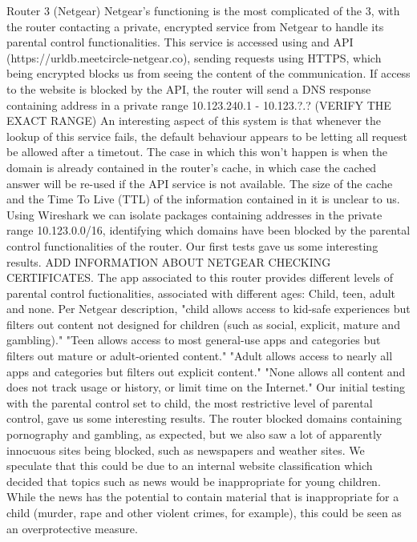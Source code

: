 Router 3 (Netgear)
Netgear's functioning is the most complicated of the 3, with the router contacting a private, encrypted service from Netgear to handle its parental control functionalities.
This service is accessed using and API (https://urldb.meetcircle-netgear.co), sending requests using HTTPS, which being encrypted blocks us from seeing the content of the communication.
If access to the website is blocked by the API, the router will send a DNS response containing address in a private range 10.123.240.1 - 10.123.?.? (VERIFY THE EXACT RANGE)
An interesting aspect of this system is that whenever the lookup of this service fails, the default behaviour appears to be letting all request be allowed after a timetout.
The case in which this won't happen is when the domain is already contained in the router's cache, in which case the cached answer will be re-used if the API service is not available.
The size of the cache and the Time To Live (TTL) of the information contained in it is unclear to us.
Using Wireshark we can isolate packages containing addresses in the private range 10.123.0.0/16, identifying which domains have been blocked by the parental control functionalities of the router.
Our first tests gave us some interesting results. 
ADD INFORMATION ABOUT NETGEAR CHECKING CERTIFICATES.
The app associated to this router provides different levels of parental control fuctionalities, associated with different ages: Child, teen, adult and none.
Per Netgear description, "child allows access to kid-safe experiences but filters out content not designed for children (such as social, explicit, mature and gambling)."
"Teen allows access to most general-use apps and categories but filters out mature or adult-oriented content."
"Adult allows access to nearly all apps and categories but filters out explicit content."
"None allows all content and does not track usage or history, or limit time on the Internet."
Our initial testing with the parental control set to child, the most restrictive level of parental control, gave us some interesting results.
The router blocked domains containing pornography and gambling, as expected, but we also saw a lot of apparently innocuous sites being blocked, such as newspapers and weather sites.
We speculate that this could be due to an internal website classification which decided that topics such as news would be inappropriate for young children.
While the news has the potential to contain material that is inappropriate for a child (murder, rape and other violent crimes, for example), this could be seen as an overprotective measure.
